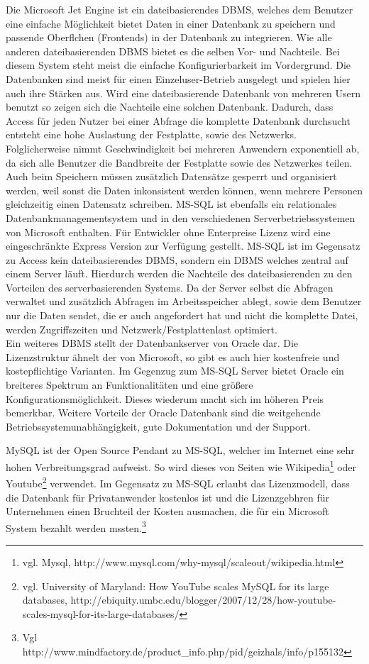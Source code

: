 Die Microsoft Jet Engine ist ein dateibasierendes DBMS, welches dem Benutzer eine einfache Möglichkeit bietet Daten in einer Datenbank zu speichern und passende Oberflchen (Frontends) in der Datenbank zu integrieren.
Wie alle anderen dateibasierenden DBMS bietet es die selben Vor- und Nachteile.
Bei diesem System steht meist die einfache Konfigurierbarkeit im Vordergrund. Die Datenbanken sind meist für einen Einzeluser-Betrieb ausgelegt und spielen hier auch ihre Stärken aus.
Wird eine dateibasierende Datenbank von mehreren Usern benutzt so zeigen sich die Nachteile eine solchen Datenbank.
Dadurch, dass Access für jeden Nutzer bei einer Abfrage die komplette Datenbank durchsucht entsteht eine hohe Auslastung der Festplatte, sowie des Netzwerks. Folglicherweise nimmt Geschwindigkeit bei mehreren Anwendern exponentiell ab, da sich alle Benutzer die Bandbreite der Festplatte sowie des Netzwerkes teilen.
Auch beim Speichern müssen zusätzlich Datensätze gesperrt und organisiert werden, weil sonst die Daten inkonsistent werden können, wenn mehrere Personen gleichzeitig einen Datensatz schreiben.
MS-SQL ist ebenfalls ein relationales Datenbankmanagementsystem
und in den verschiedenen Serverbetriebssystemen von Microsoft enthalten. Für Entwickler
ohne Enterpreise Lizenz wird eine eingeschränkte Express Version zur Verfügung gestellt. MS-SQL ist im Gegensatz zu Access kein dateibasierendes DBMS, sondern ein DBMS welches
zentral auf einem Server läuft. Hierdurch werden die Nachteile des dateibasierenden zu
den Vorteilen des serverbasierenden Systems. Da der Server selbst die Abfragen verwaltet
und zusätzlich Abfragen im Arbeitsspeicher ablegt, sowie dem Benutzer nur die Daten
sendet, die er auch angefordert hat und nicht die komplette Datei, werden Zugriffszeiten
und Netzwerk/Festplattenlast optimiert.\\
Ein weiteres DBMS stellt der Datenbankserver von Oracle dar. Die Lizenzstruktur ähnelt der von Microsoft, so gibt es auch hier kostenfreie und kostepflichtige Varianten. Im Gegenzug zum MS-SQL Server bietet Oracle ein breiteres Spektrum an Funktionalitäten und eine größere Konfigurationsmöglichkeit. Dieses wiederum macht sich im höheren Preis bemerkbar. Weitere Vorteile der Oracle Datenbank sind die weitgehende Betriebssystemunabhängigkeit, gute Dokumentation und der Support.

MySQL ist der Open Source Pendant zu MS-SQL, welcher im Internet eine sehr hohen Verbreitungsgrad aufweist.
So wird dieses von Seiten wie Wikipedia\footnote{vgl. Mysql, http://www.mysql.com/why-mysql/scaleout/wikipedia.html} oder
Youtube\footnote{vgl. University of Maryland: How YouTube scales MySQL for its large databases, http://ebiquity.umbc.edu/blogger/2007/12/28/how-youtube-scales-mysql-for-its-large-databases/} verwendet.
Im Gegensatz zu MS-SQL erlaubt das Lizenzmodell, dass die Datenbank für Privatanwender kostenlos ist und die Lizenzgebhren für Unternehmen einen Bruchteil der Kosten ausmachen, die für ein Microsoft System bezahlt werden mssten.\footnote{Vgl http://www.mindfactory.de/product\_info.php/pid/geizhals/info/p155132}

